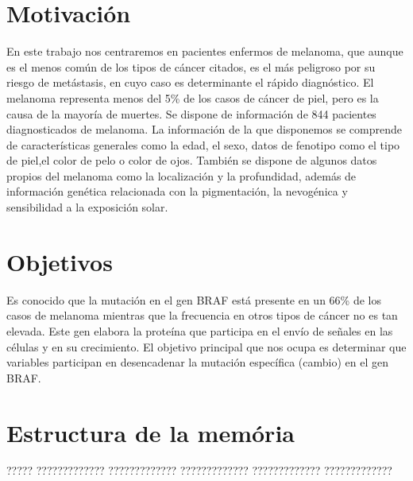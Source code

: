 \documentclass[11pt,spanish,listoffigures,listoftables]{tfgetsinf}
\begin{document}
\section{Motivaci\'on}
En este trabajo nos centraremos en pacientes enfermos de melanoma, que aunque es el menos com\'un de los tipos de c\'ancer citados, es el m\'as peligroso por su riesgo de met\'astasis, en cuyo caso es determinante el r\'apido diagn\'ostico.\newline
El melanoma representa menos del 5\% de los casos de c\'ancer de piel, pero es la causa de la mayor\'ia de muertes.\newline
Se dispone de informaci\'on de 844 pacientes diagnosticados de melanoma. La informaci\'on de la que disponemos se comprende de caracter\'isticas generales como la edad, el sexo, datos de fenotipo como el tipo de piel,el  color de pelo o color de ojos. Tambi\'en se dispone de algunos datos propios del melanoma como la localizaci\'on y la profundidad, adem\'as de informaci\'on gen\'etica relacionada con la pigmentaci\'on, la nevog\'enica y sensibilidad a la exposici\'on solar.

\section{Objetivos}
Es conocido que la mutaci\'on en el gen BRAF est\'a presente en un 66\% de los casos de melanoma mientras que la frecuencia en otros tipos de c\'ancer no es tan elevada. Este gen elabora la prote\'ina que participa en el env\'io de se\~nales en las c\'elulas y en su crecimiento.\newline
El objetivo principal que nos ocupa es determinar que variables participan en desencadenar la mutaci\'on espec\'ifica (cambio) en el gen BRAF.

\section{Estructura de la mem\'oria}

????? ????????????? ????????????? ????????????? ????????????? ????????????? 



\end{document}
